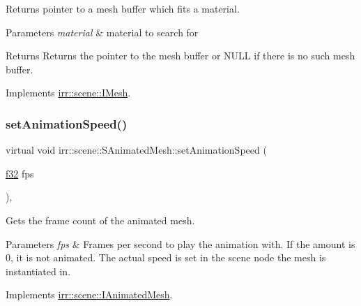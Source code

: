 Returns pointer to a mesh buffer which fits a material. 


\begin{DoxyParams}{Parameters}
{\em material} & material to search for \\
\hline
\end{DoxyParams}
\begin{DoxyReturn}{Returns}
Returns the pointer to the mesh buffer or N\+U\+LL if there is no such mesh buffer. 
\end{DoxyReturn}


Implements \hyperlink{classirr_1_1scene_1_1IMesh_a9573dace82efb01ba1f35f9cc28a4ced}{irr\+::scene\+::\+I\+Mesh}.

\mbox{\label{structirr_1_1scene_1_1SAnimatedMesh_ae7a32638fe5c59007d044bbc3c170108}} 
\subsubsection{\texorpdfstring{set\+Animation\+Speed()}{setAnimationSpeed()}\hspace{0.1cm}{\footnotesize\ttfamily [1/2]}}
{\footnotesize\ttfamily virtual void irr\+::scene\+::\+S\+Animated\+Mesh\+::set\+Animation\+Speed (\begin{DoxyParamCaption}\item[{\hyperlink{namespaceirr_a0277be98d67dc26ff93b1a6a1d086b07}{f32}}]{fps }\end{DoxyParamCaption})\hspace{0.3cm}{\ttfamily [inline]}, {\ttfamily [virtual]}}



Gets the frame count of the animated mesh. 


\begin{DoxyParams}{Parameters}
{\em fps} & Frames per second to play the animation with. If the amount is 0, it is not animated. The actual speed is set in the scene node the mesh is instantiated in. \\
\hline
\end{DoxyParams}


Implements \hyperlink{classirr_1_1scene_1_1IAnimatedMesh_a5eb1b09d96547dbd273d489e58d62658}{irr\+::scene\+::\+I\+Animated\+Mesh}.

